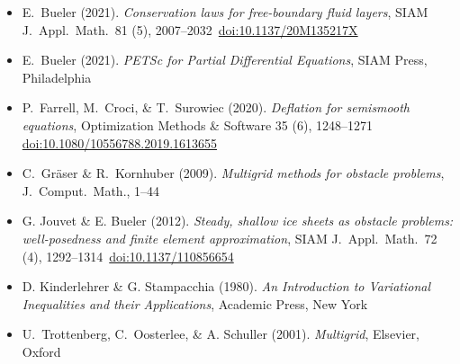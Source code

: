 
\newcommand{\shref}[2]{\,{\tiny \href{#1}{#2}}}
\begin{itemize}
\item[] E.~Bueler (2021). \emph{Conservation laws for free-boundary fluid layers}, SIAM J.~Appl.~Math.~81 (5), 2007--2032 \shref{https://doi.org/10.1137/20M135217X}{doi:10.1137/20M135217X}
\item[] E.~Bueler (2021). \emph{PETSc for Partial Differential Equations}, SIAM Press, Philadelphia
\item[] P.~Farrell, M.~Croci, \& T.~Surowiec (2020). \emph{Deflation for semismooth equations}, Optimization Methods \& Software 35 (6), 1248--1271 \shref{https://doi.org/10.1080/10556788.2019.1613655}{doi:10.1080/10556788.2019.1613655}
\item[] C.~Gr{\"a}ser \& R.~Kornhuber (2009). \emph{Multigrid methods for obstacle problems}, J.~Comput.~Math., 1--44
\item[] G. Jouvet \& E. Bueler (2012). \emph{Steady, shallow ice sheets as obstacle problems: well-posedness and finite element approximation}, SIAM J.~Appl.~Math.~72 (4), 1292--1314 \shref{https://doi.org/10.1137/110856654}{doi:10.1137/110856654}
\item[] D. Kinderlehrer \& G. Stampacchia (1980). \emph{An Introduction to Variational Inequalities and their Applications}, Academic Press, New York
\item[] U.~Trottenberg, C.~Oosterlee, \& A. Schuller (2001).  \emph{Multigrid}, Elsevier, Oxford
\end{itemize}

